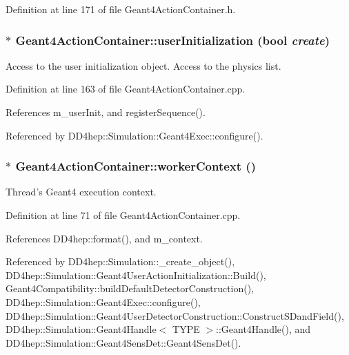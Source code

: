 Definition at line 171 of file Geant4ActionContainer.h.\hypertarget{class_d_d4hep_1_1_simulation_1_1_geant4_action_container_a04ba4fd85ae343b856d73dcb3cc0e9b3}{
\subsubsection[{userInitialization}]{ $\ast$ Geant4ActionContainer::userInitialization (bool {\em create})}}
\label{class_d_d4hep_1_1_simulation_1_1_geant4_action_container_a04ba4fd85ae343b856d73dcb3cc0e9b3}


Access to the user initialization object. Access to the physics list. 

Definition at line 163 of file Geant4ActionContainer.cpp.

References m\_\-userInit, and registerSequence().

Referenced by DD4hep::Simulation::Geant4Exec::configure().\hypertarget{class_d_d4hep_1_1_simulation_1_1_geant4_action_container_a6fe45521592147fe47d7cc545add8ca0}{
\subsubsection[{workerContext}]{ $\ast$ Geant4ActionContainer::workerContext ()}}
\label{class_d_d4hep_1_1_simulation_1_1_geant4_action_container_a6fe45521592147fe47d7cc545add8ca0}


Thread's Geant4 execution context. 

Definition at line 71 of file Geant4ActionContainer.cpp.

References DD4hep::format(), and m\_\-context.

Referenced by DD4hep::Simulation::\_\-create\_\-object(), DD4hep::Simulation::Geant4UserActionInitialization::Build(), Geant4Compatibility::buildDefaultDetectorConstruction(), DD4hep::Simulation::Geant4Exec::configure(), DD4hep::Simulation::Geant4UserDetectorConstruction::ConstructSDandField(), DD4hep::Simulation::Geant4Handle$<$ TYPE $>$::Geant4Handle(), and DD4hep::Simulation::Geant4SensDet::Geant4SensDet().

